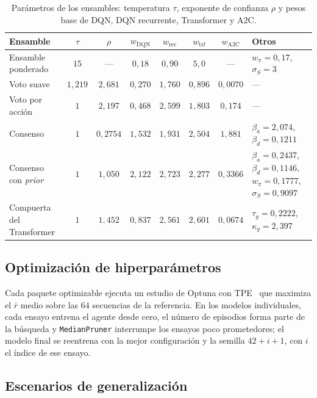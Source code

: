 \documentclass[../00_Main/Main.tex]{subfiles}
\begin{document}
\begin{table}[!htb]
\centering
\caption[Par\'ametros de los ensambles]{Par\'ametros de los ensambles:
temperatura $\tau$, exponente de confianza $\rho$ y pesos base de DQN,
DQN recurrente, Transformer y A2C.}
\label{tab:ens-params}
\footnotesize
\setlength{\tabcolsep}{4pt}
\begin{tabular}{@{}lcccccc>{\raggedright\arraybackslash}p{3.4cm}@{}}
\toprule
\textbf{Ensamble} & $\tau$ & $\rho$ & $w_{\mathrm{DQN}}$ & $w_{\mathrm{rec}}$ & $w_{\mathrm{trf}}$ & $w_{\mathrm{A2C}}$ & \textbf{Otros} \\
\midrule
Ensamble ponderado & $15$ & --- & $0{,}18$ & $0{,}90$ & $5{,}0$ & --- & $w_\pi = 0{,}17$, $\sigma_S = 3$ \\
Voto suave & $1{,}219$ & $2{,}681$ & $0{,}270$ & $1{,}760$ & $0{,}896$ & $0{,}0070$ & --- \\
Voto por acci\'on & $1$ & $2{,}197$ & $0{,}468$ & $2{,}599$ & $1{,}803$ & $0{,}174$ & --- \\
Consenso & $1$ & $0{,}2754$ & $1{,}532$ & $1{,}931$ & $2{,}504$ & $1{,}881$ & $\beta_a = 2{,}074$, $\beta_d = 0{,}1211$ \\
Consenso con \emph{prior} & $1$ & $1{,}050$ & $2{,}122$ & $2{,}723$ & $2{,}277$ & $0{,}3366$ & $\beta_a = 0{,}2437$, $\beta_d = 0{,}1146$, $w_\pi = 0{,}1777$, $\sigma_S = 0{,}9097$ \\
Compuerta del Transformer & $1$ & $1{,}452$ & $0{,}837$ & $2{,}561$ & $2{,}601$ & $0{,}0674$ & $\tau_g = 0{,}2222$, $\kappa_g = 2{,}397$ \\
\bottomrule
\end{tabular}
\end{table}

\subsection{Optimizaci\'on de hiperpar\'ametros}

Cada paquete optimizable ejecuta un estudio de Optuna con
TPE~\citep{Bergstra2011,Akiba2019} que maximiza el $\bar r$ medio sobre
las $64$ secuencias de la referencia. En los modelos individuales, cada
ensayo entrena el agente desde cero, el n\'umero de episodios forma parte
de la b\'usqueda y \texttt{MedianPruner} interrumpe los ensayos poco
prometedores; el modelo final se reentrena con la mejor configuraci\'on y
la semilla $42 + i + 1$, con $i$ el \'indice de ese ensayo.

\subsection{Escenarios de generalizaci\'on}\label{sec:scenario-catalogue}
\end{document}
